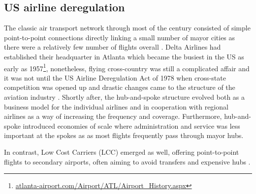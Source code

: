 \label{sec:background}

\subsection{US airline deregulation}
\label{subsec:b_deregulation}
The classic air transport network through most of the  century consisted of simple point-to-point connections directly linking a small number of mayor cities as there were a relatively few number of flights overall \citep{marti2015efficiency}. Delta Airlines had established their headquarter in Atlanta which became the busiest in the US as early as 1957\footnote{\href{https://web.archive.org/web/20110301150527/http://www.atlanta-airport.com/Airport/ATL/Airport_History.aspx}{atlanta-airport.com/Airport/ATL/Airport_History.aspx}}, nonetheless, flying cross-country was still a complicated affair and it was not until the US Airline Deregulation Act of 1978 when cross-state competition was opened up and drastic changes came to the structure of the aviation industry \citep{forbes2007role, daraban2012low}. Shortly after, the hub-and-spoke structure evolved both as a business model for the individual airlines and in cooperation with regional airlines \citep{forbes2007role} as a way of increasing the frequency and coverage. Furthermore, hub-and-spoke introduced economies of scale where administration and service was less important at the spokes as as most flights frequently pass through mayor hubs.
\par
In contrast, Low Cost Carriers (LCC) emerged as well, offering point-to-point flights to secondary airports, often aiming to avoid transfers and expensive hubs \citep{daraban2012low}.

